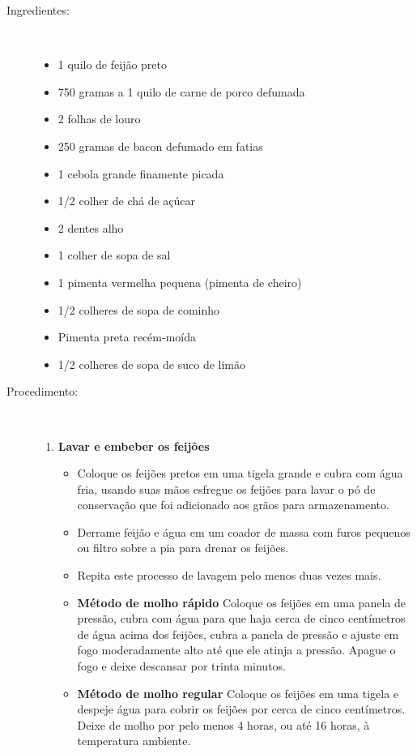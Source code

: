 \documentclass [11pt, letterpaper] {article}
\begin{document}
\begin {description}

\item [Ingredientes:] \ \\
\begin {itemize}
\item 1 quilo de feijão preto
\item 750 gramas a 1 quilo de carne de porco defumada
\item 2 folhas de louro
\item 250 gramas de bacon defumado em fatias
\item 1 cebola grande finamente picada
\item 1/2 colher de chá de açúcar
\item 2 dentes alho
\item 1 colher de sopa de sal
\item 1 pimenta vermelha pequena (pimenta de cheiro)
\item 1/2 colheres de sopa de cominho
\item Pimenta preta recém-moída
\item 1/2 colheres de sopa de suco de limão
\end {itemize}

\item [Procedimento:] \ \\

\begin {enumerate}
\item {\bf Lavar e embeber os feijões}
\begin {itemize}
\item Coloque os feijões pretos em uma tigela grande e cubra com água fria, usando suas mãos esfregue os feijões para lavar o pó de conservação que foi adicionado aos grãos para armazenamento.
\item Derrame feijão e água em um coador de massa com furos pequenos ou filtro sobre a pia para drenar os feijões.
\item Repita este processo de lavagem pelo menos duas vezes mais.
\item {\bf Método de molho rápido} Coloque os feijões em uma panela de pressão, cubra com água para que haja cerca de cinco cent\'imetros de água acima dos feijões, cubra a panela de pressão e ajuste em fogo moderadamente alto até que ele atinja a pressão. Apague o fogo e deixe descansar por trinta minutos.
\item {\bf Método de molho regular} Coloque os feijões em uma tigela e despeje água para cobrir os feijões por cerca de cinco cent\'imetros. Deixe de molho por pelo menos 4 horas, ou até 16 horas, à temperatura ambiente.
\end {itemize}


\end{enumerate}
\end{description}
\end{document}
